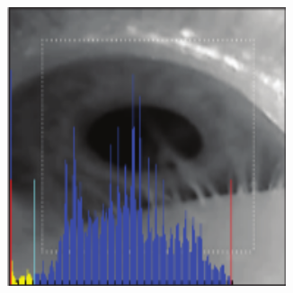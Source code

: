 \documentclass[USenglish,twocolumn]{article}
\begin{document}
\begin{figure}[H]
\begin{subfigure}[b]{0.15\textwidth}
		\caption{}
		\label{fig:pupilLab2}
	\end{subfigure}%
	\begin{subfigure}[b]{0.15\textwidth}
	\centering
	\includegraphics[width=0.9\textwidth]{img/PupilLab/3.png}
	\caption{}
	\label{fig:pupilLab3}
\end{subfigure}


\end{figure}
\end{document}
